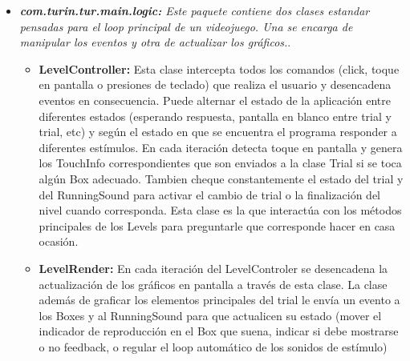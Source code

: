\documentclass{article}
\begin{document}
\begin{itemize}
         \item \textit{\textbf{com.turin.tur.main.logic:} Este paquete contiene dos clases estandar pensadas para el loop principal de un videojuego. Una se encarga de manipular los eventos y otra de actualizar los gráficos.}.
         \begin{itemize}
             \item \textbf{LevelController:} Esta clase intercepta todos los comandos (click, toque en pantalla o presiones de teclado) que realiza el usuario y desencadena eventos en consecuencia. Puede alternar el estado de la aplicación entre diferentes estados (esperando respuesta, pantalla en blanco entre trial y trial, etc) y según el estado en que se encuentra el programa responder a diferentes estímulos. En cada iteración detecta toque en pantalla y genera los TouchInfo correspondientes que son enviados a la clase Trial si se toca algún Box adecuado. Tambien cheque constantemente el estado del trial y del RunningSound para activar el cambio de trial o la finalización del nivel cuando corresponda. Esta clase es la que interactúa con los métodos principales de los Levels para preguntarle que corresponde hacer en casa ocasión. 
             \item \textbf{LevelRender:} En cada iteración del LevelControler se desencadena la actualización de los gráficos en pantalla a través de esta clase. La clase además de graficar los elementos principales del trial le envía un evento a los Boxes y al RunningSound para que actualicen su estado (mover el indicador de reproducción en el Box que suena, indicar si debe mostrarse o no feedback, o regular el loop automático de los sonidos de estímulo)
         \end{itemize}
        

\end{itemize}
\end{document}
